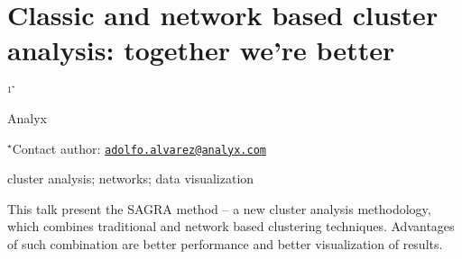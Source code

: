 \documentclass[\main/boa.tex]{subfiles}
\begin{document}
\section{Classic and network based cluster analysis: together we're better}

\begin{center}
  {\bf {}$^{1^\star}$}
\end{center}

\vskip 0.3cm

\begin{affiliations}
\begin{enumerate}
\begin{minipage}{0.915\textwidth}
\centering
\item Analyx \\[-2pt]
\end{minipage}
\end{enumerate}
$^\star$Contact author: \href{mailto:adolfo.alvarez@analyx.com}{\nolinkurl{adolfo.alvarez@analyx.com}}\\
\end{affiliations}

\vskip 0.5cm

\begin{minipage}{0.915\textwidth}
\keywords cluster analysis; networks; data visualization
\end{minipage}

\vskip 0.8cm

This talk present the SAGRA method -- a new cluster analysis
methodology, which combines traditional and network based clustering
techniques. Advantages of such combination are better performance and
better visualization of results.
\end{document}
